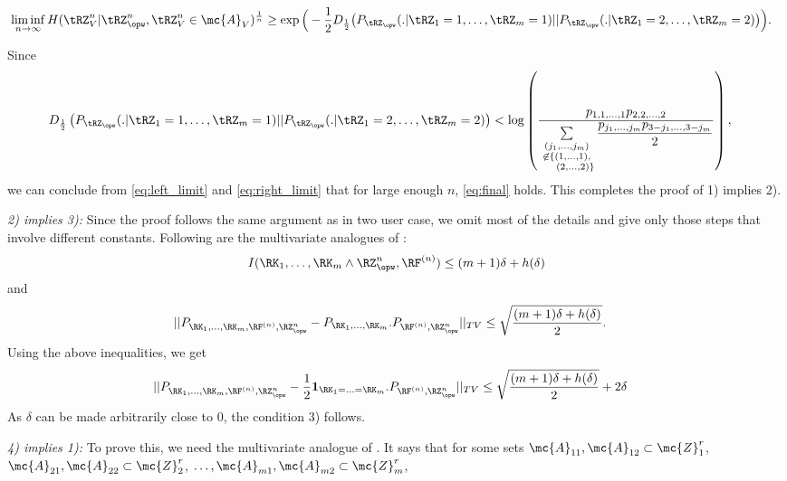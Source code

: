  \begin{align}\label{eq:right_limit}
 &\liminf_{n \to \infty} H(\tRZ^n_V|\tRZ^n_{\opw},\tRZ^n_V\in \mc{A}_{V})^{\frac{1}{n}} \geq  \exp \Big(-\frac{1}{2}D_{\frac{1}{2}} \big(P_{\tRZ_{\opw}}(.|\tRZ_1=1, \ldots, \tRZ_m=1)  ||P_{\tRZ_{\opw}}(.|\tRZ_1=2, \ldots, \tRZ_m=2) \big)\Big).
 \end{align}


 

Since 
\begin{align*}
       &D_{\frac{1}{2}} \left(P_{\tRZ_{\opw}}(.|\tRZ_1=1, \ldots, \tRZ_m=1)  
       ||P_{\tRZ_{\opw}}(.|\tRZ_1=2, \ldots, \tRZ_m=2) \right)
       < \log \left(\frac{p_{1,1,\ldots,1}p_{2,2,\ldots,2}}{\sum \limits_{\substack{(j_1,\ldots,j_m)\\ \not\in \{(1,\ldots,1),\\\mkern 30mu (2,\ldots,2)\}}}\dfrac{p_{j_1, \ldots, j_m}p_{3-j_1,\ldots, 3-j_m}}{2}}\right),
 \end{align*}
 we can conclude from \eqref{eq:left_limit} and \eqref{eq:right_limit} that 
for large enough $n$, \eqref{eq:final} holds. This completes the proof of 1) implies 2).
 
\textit{2) implies 3):} Since the proof follows the same argument as in two user case, we omit most of the details and give only those steps that involve different constants. Following are the multivariate analogues of \cite[eq.~(118) and eq.~(124)]{amin2020}: 
\begin{align*}
    I(\RK_1,\ldots,\RK_m \wedge \RZ^n_{\opw}, \RF^{(n)}) \leq (m+1)\delta+h(\delta)
\end{align*}
and 
\begin{align*}
    &||P_{\RK_1,\ldots, \RK_m,\RF^{(n)},\RZ^n_{\opw}}-P_{\RK_1,\ldots, \RK_m}.P_{\RF^{(n)},\RZ^n_{\opw}}||_{TV}  \leq \sqrt{\frac{(m+1)\delta + h(\delta)}{2}}.
\end{align*}
Using the above inequalities, we get 
\begin{align*}
    &||P_{\RK_1,\ldots, \RK_m,\RF^{(n)},\RZ^n_{\opw}}-\dfrac{1}{2}\mathbf{1}_{\RK_1=\ldots=\RK_m}.P_{\RF^{(n)},\RZ^n_{\opw}}||_{TV}  \leq
    \sqrt{\frac{(m+1)\delta + h(\delta)}{2}}+2\delta
\end{align*}
As $\delta$ can be made arbitrarily close to 0, the condition 3) follows.

\textit{4) implies 1):} To prove this, we need the multivariate analogue of \cite[Lemma~3]{amin2020}. It says that for some sets  $\mc{A}_{11},\mc{A}_{12} \subset \mc{Z}_1^r$, $\mc{A}_{21},\mc{A}_{22} \subset \mc{Z}_2^r$, $\ldots, \mc{A}_{m1},\mc{A}_{m2} \subset \mc{Z}_m^r$,


